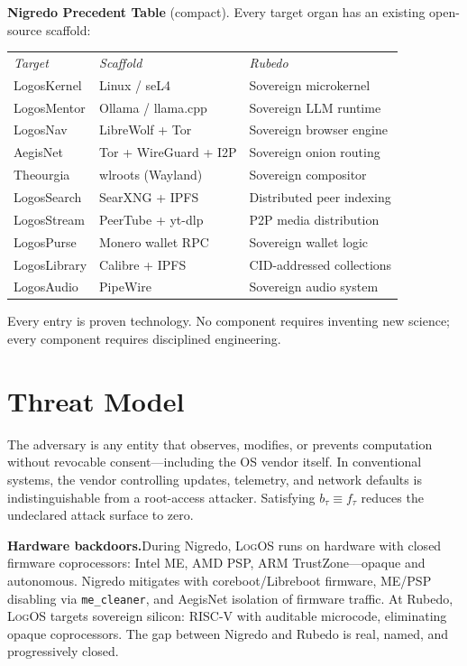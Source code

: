 \documentclass[11pt, oneside]{article}
\newcommand{\sep}{%
    \begin{center}\vspace{2pt}%
    \textcolor{LogosGray}{\textemdash\textemdash\textemdash}%
    \vspace{2pt}\end{center}%
}
\newcommand{\LogOS}{\textnormal{\textsc{LogOS}}}
\begin{document}
\sep

\noindent\textbf{Nigredo Precedent Table} (compact). Every target organ
has an existing open-source scaffold:

\begin{center}
\small
\begin{tabular}{lll}
\textit{Target} & \textit{Scaffold} & \textit{Rubedo} \\[3pt]
LogosKernel & Linux / seL4 & Sovereign microkernel \\
LogosMentor & Ollama / llama.cpp & Sovereign LLM runtime \\
LogosNav & LibreWolf + Tor & Sovereign browser engine \\
AegisNet & Tor + WireGuard + I2P & Sovereign onion routing \\
Theourgia & wlroots (Wayland) & Sovereign compositor \\
LogosSearch & SearXNG + IPFS & Distributed peer indexing \\
LogosStream & PeerTube + yt-dlp & P2P media distribution \\
LogosPurse & Monero wallet RPC & Sovereign wallet logic \\
LogosLibrary & Calibre + IPFS & CID-addressed collections \\
LogosAudio & PipeWire & Sovereign audio system \\
\end{tabular}
\end{center}

\noindent Every entry is proven technology. No component requires
inventing new science; every component requires disciplined engineering.

\section{Threat Model}

The adversary is any entity that observes, modifies, or prevents
computation without revocable consent---including the OS vendor itself.
In conventional systems, the vendor controlling updates, telemetry, and
network defaults is indistinguishable from a root-access attacker.
Satisfying $b_\tau \equiv f_\tau$ reduces the undeclared attack surface
to zero.

\medskip
\noindent\textbf{Hardware backdoors.}\quad During Nigredo, \LogOS{} runs
on hardware with closed firmware coprocessors: Intel ME, AMD PSP, ARM
TrustZone---opaque and autonomous. Nigredo mitigates with
coreboot/Libreboot firmware, ME/PSP disabling via
\texttt{me\_cleaner}, and AegisNet isolation of firmware traffic. At
Rubedo, \LogOS{} targets sovereign silicon: RISC-V with auditable
microcode, eliminating opaque coprocessors. The gap between Nigredo and
Rubedo is real, named, and progressively closed.
\end{document}
